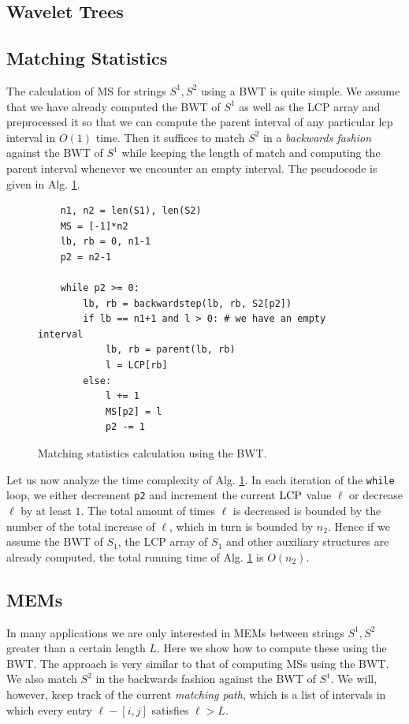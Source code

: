 \subsection{Wavelet Trees}

\subsection{Matching Statistics}
The calculation of MS for strings $S^1, S^2$ using a BWT is quite simple.
We assume that we have already computed the BWT of $S^1$ as well as the LCP array and preprocessed it so that we can compute the parent interval of any particular lcp interval in $O(1)$ time.
Then it suffices to match $S^2$ in a \textit{backwards fashion} against the BWT of $S^1$ while keeping the length of match and computing the parent interval whenever we encounter an empty interval.
The pseudocode is given in Alg. \ref{alg:BWTMS}.

\begin{figure}[!ht]
    \centering
    \begin{verbatim}
    n1, n2 = len(S1), len(S2)
    MS = [-1]*n2
    lb, rb = 0, n1-1
    p2 = n2-1
    
    while p2 >= 0:
        lb, rb = backwardstep(lb, rb, S2[p2])
        if lb == n1+1 and l > 0: # we have an empty interval
            lb, rb = parent(lb, rb)
            l = LCP[rb]
        else:
            l += 1
            MS[p2] = l
            p2 -= 1
    \end{verbatim}
    \caption{Matching statistics calculation using the BWT.}
    \label{alg:BWTMS}
\end{figure}

Let us now analyze the time complexity of Alg. \ref{alg:BWTMS}.
In each iteration of the \texttt{while} loop, we either decrement \texttt{p2} and increment the current $\text{LCP}$ value $\ell$ or decrease $\ell$ by at least $1$.
The total amount of times $\ell$ is decreased is bounded by the number of the total increase of $\ell$, which in turn is bounded by $n_2$.
Hence if we assume the BWT of $S_1$, the LCP array of $S_1$ and other auxiliary structures are already computed, the total running time of Alg. \ref{alg:BWTMS} is $O(n_2)$.

\subsection{MEMs}
In many applications we are only interested in MEMs between strings $S^1, S^2$ greater than a certain length $L$.
Here we show how to compute these using the BWT.
The approach is very similar to that of computing MSs using the BWT.
We also match $S^2$ in the backwards fashion against the BWT of $S^1$.
We will, however, keep track of the current \textit{matching path}, which is a list of intervals in which every entry $\ell - [i,j]$ satisfies $\ell > L$.

